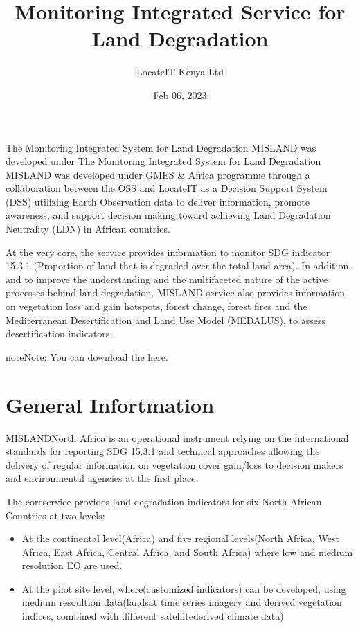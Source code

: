 \documentclass[letterpaper,10pt,english]{sphinxmanual}
\title{Monitoring Integrated Service for Land Degradation}
\date{Feb 06, 2023}
\author{LocateIT Kenya Ltd}
\begin{document}
\pagestyle{empty}
\sphinxmaketitle
\pagestyle{plain}
\sphinxtableofcontents
\pagestyle{normal}
\label{\detokenize{index::doc}}




\sphinxAtStartPar
The Monitoring Integrated System for Land Degradation MISLAND was developed under
The Monitoring Integrated System for Land Degradation MISLAND was developed under
GMES \& Africa programme through a collaboration between the OSS and LocateIT  as a Decision Support System (DSS) utilizing Earth Observation data to deliver information, promote awareness, and support decision making toward achieving Land Degradation Neutrality (LDN) in African countries.

\sphinxAtStartPar
At the very core, the service provides information to monitor SDG indicator 15.3.1
(Proportion of land that is degraded over the total land area). In addition, and to
improve the understanding and the multi\sphinxhyphen{}faceted nature of the active processes
behind land degradation, MISLAND service also provides information on vegetation
loss and gain hotspots, forest change, forest fires and the Mediterranean Desertification
and Land Use Model (MEDALUS), to assess desertification indicators.

\begin{sphinxadmonition}{note}{Note:}
\sphinxAtStartPar
You can download the  here.
\end{sphinxadmonition}

\sphinxstepscope


\chapter{General Infortmation}
\label{\detokenize{Introduction/general_information:general-infortmation}}\label{\detokenize{Introduction/general_information::doc}}
\sphinxAtStartPar
MISLAND\sphinxhyphen{}North Africa is an operational instrument relying on the international standards for reporting SDG 15.3.1 and technical approaches allowing the delivery of regular information on vegetation cover gain/loss to decision makers and environmental agencies at the first place.

\sphinxAtStartPar
The core\sphinxhyphen{}service provides land degradation indicators for six North African Countries at two levels:
\begin{itemize}
\item {} 
\sphinxAtStartPar
At the continental level(Africa) and five regional levels(North Africa, West Africa, East Africa, Central Africa, and South Africa) where low and medium resolution EO are used.

\item {} 
\sphinxAtStartPar
At the pilot site level, where(customized indicators) can be developed, using medium resoultion data(landsat time series imagery and derived vegetation indices, combined with different satellite\sphinxhyphen{}derived climate data)

\end{itemize}
\end{document}
